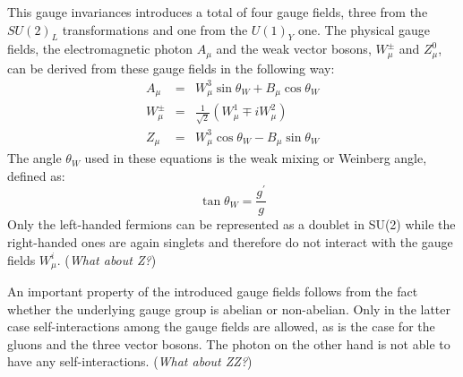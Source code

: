 \begin{myindentpar}
\begin{description}
    This gauge invariances introduces a total of four gauge fields, three from the $SU(2)_L$ transformations and one from the $U(1)_Y$ one.
    The physical gauge fields, the electromagnetic photon $A_{\mu}$ and the weak vector bosons, $W^{\pm}_{\mu}$ and $Z^{0}_{\mu}$, can be derived from these gauge fields in the following way:
    \begin{eqnarray}
     A_{\mu} & = & W_{\mu}^{3} \sin \theta_{W} + B_{\mu} \cos \theta_{W} \nonumber \\
     W_{\mu}^{\pm} & = & \frac{1}{\sqrt{2}} \left( W_{\mu}^{1} \mp i W_{\mu}^{2} \right) \label{eq::EWGaugeBosons} \\
     Z_{\mu} & = & W_{\mu}^{3} \cos \theta_{W} - B_{\mu} \sin \theta_{W} \nonumber
    \end{eqnarray}
    The angle $\theta_{W}$ used in these equations is the weak mixing or Weinberg angle, defined as:
    \begin{equation}
     \tan \theta_{W} = \frac{g^{'}}{g}
    \end{equation}
    Only the left-handed fermions can be represented as a doublet in SU(2) while the right-handed ones are again singlets and therefore do not interact with the gauge fields $W_{\mu}^{i}$. (\textit{What about Z?})
   \end{description}
\end{myindentpar}

An important property of the introduced gauge fields follows from the fact whether the underlying gauge group is abelian or non-abelian. Only in the latter case self-interactions among the gauge fields are allowed, as is the case for the gluons and the three vector bosons. The photon on the other hand is not able to have any self-interactions. (\textit{What about ZZ?})

